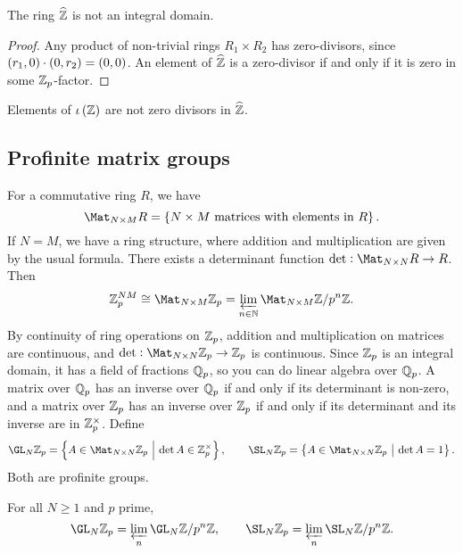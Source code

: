 \begin{corollary}
The ring $ \widehat{\mathbb{Z}} $ is not an integral domain.
\end{corollary}

\begin{proof}
Any product of non-trivial rings $ R_1 \times R_2 $ has zero-divisors, since $ \br{r_1, 0} \cdot \br{0, r_2} = \br{0, 0} $. An element of $ \widehat{\mathbb{Z}} $ is a zero-divisor if and only if it is zero in some $ \mathbb{Z}_p $-factor.
\end{proof}

Elements of $ \iota\br{\ZZ} $ are not zero divisors in $ \widehat{\mathbb{Z}} $.

\pagebreak

\subsection{Profinite matrix groups}


For a commutative ring $ R $, we have
$$ \Mat_{N \times M} R = \cbr{N \times M \ \text{matrices with elements in} \ R}. $$
If $ N = M $, we have a ring structure, where addition and multiplication are given by the usual formula. There exists a determinant function $ \det : \Mat_{N \times N} R \to R $. Then
$$ \ZZ_p^{NM} \cong \Mat_{N \times M} \ZZ_p = \varprojlim_{n \in \NN} \Mat_{N \times M} \ZZ / p^n\ZZ. $$
By continuity of ring operations on $ \mathbb{Z}_p $, addition and multiplication on matrices are continuous, and $ \det : \Mat_{N \times N} \ZZ_p \to \ZZ_p $ is continuous. Since $ \mathbb{Z}_p $ is an integral domain, it has a field of fractions $ \mathbb{Q}_p $, so you can do linear algebra over $ \mathbb{Q}_p $. A matrix over $ \mathbb{Q}_p $ has an inverse over $ \mathbb{Q}_p $ if and only if its determinant is non-zero, and a matrix over $ \mathbb{Z}_p $ has an inverse over $ \mathbb{Z}_p $ if and only if its determinant and its inverse are in $ \mathbb{Z}_p^\times $. Define
$$ \GL_N \ZZ_p = \cbr{A \in \Mat_{N \times N} \ZZ_p \st \det A \in \ZZ_p^\times}, \qquad \SL_N \ZZ_p = \cbr{A \in \Mat_{N \times N} \ZZ_p \st \det A = 1}. $$
Both are profinite groups.

\begin{lemma}
For all $ N \ge 1 $ and $ p $ prime,
$$ \GL_N \ZZ_p = \varprojlim_n \GL_N \ZZ / p^n\ZZ, \qquad \SL_N \ZZ_p = \varprojlim_n \SL_N \ZZ / p^n\ZZ. $$
\end{lemma}

